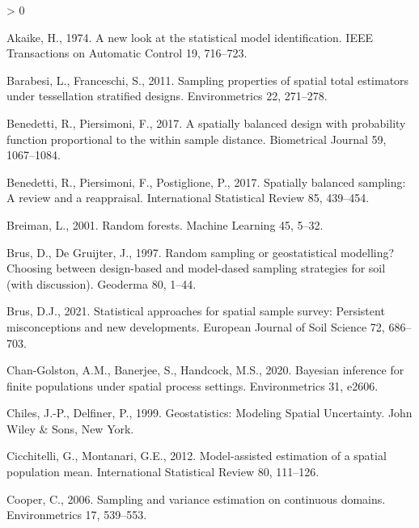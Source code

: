\documentclass[]{elsarticle} %
\newlength{\cslhangindent}
\newenvironment{CSLReferences}[2] %
 {%
  \setlength{\parindent}{0pt}
  \ifodd #1 \everypar{\setlength{\hangindent}{\cslhangindent}}\ignorespaces\fi
  \ifnum #2 > 0
  \setlength{\parskip}{#2\baselineskip}
  \fi
 }%
 {}
\begin{document}
\hypertarget{refs}{}
\begin{CSLReferences}{1}{0}
\leavevmode\hypertarget{ref-akaike1974new}{}%
Akaike, H., 1974. A new look at the statistical model identification.
IEEE Transactions on Automatic Control 19, 716--723.

\leavevmode\hypertarget{ref-barabesi2011sampling}{}%
Barabesi, L., Franceschi, S., 2011. Sampling properties of spatial total
estimators under tessellation stratified designs. Environmetrics 22,
271--278.

\leavevmode\hypertarget{ref-benedetti2017spatially}{}%
Benedetti, R., Piersimoni, F., 2017. A spatially balanced design with
probability function proportional to the within sample distance.
Biometrical Journal 59, 1067--1084.

\leavevmode\hypertarget{ref-benedetti2017spatiallyreview}{}%
Benedetti, R., Piersimoni, F., Postiglione, P., 2017. Spatially balanced
sampling: A review and a reappraisal. International Statistical Review
85, 439--454.

\leavevmode\hypertarget{ref-breiman2001random}{}%
Breiman, L., 2001. Random forests. Machine Learning 45, 5--32.

\leavevmode\hypertarget{ref-brus1997random}{}%
Brus, D., De Gruijter, J., 1997. Random sampling or geostatistical
modelling? Choosing between design-based and model-dased sampling
strategies for soil (with discussion). Geoderma 80, 1--44.

\leavevmode\hypertarget{ref-brus2021statistical}{}%
Brus, D.J., 2021. Statistical approaches for spatial sample survey:
Persistent misconceptions and new developments. European Journal of Soil
Science 72, 686--703.

\leavevmode\hypertarget{ref-chan2020bayesian}{}%
Chan-Golston, A.M., Banerjee, S., Handcock, M.S., 2020. Bayesian
inference for finite populations under spatial process settings.
Environmetrics 31, e2606.

\leavevmode\hypertarget{ref-chiles1999geostatistics}{}%
Chiles, J.-P., Delfiner, P., 1999. Geostatistics: {Modeling Spatial
Uncertainty}. {John Wiley \& Sons}, New York.

\leavevmode\hypertarget{ref-cicchitelli2012model}{}%
Cicchitelli, G., Montanari, G.E., 2012. Model-assisted estimation of a
spatial population mean. International Statistical Review 80, 111--126.

\leavevmode\hypertarget{ref-cooper2006sampling}{}%
Cooper, C., 2006. Sampling and variance estimation on continuous
domains. Environmetrics 17, 539--553.


\end{CSLReferences}
\end{document}
